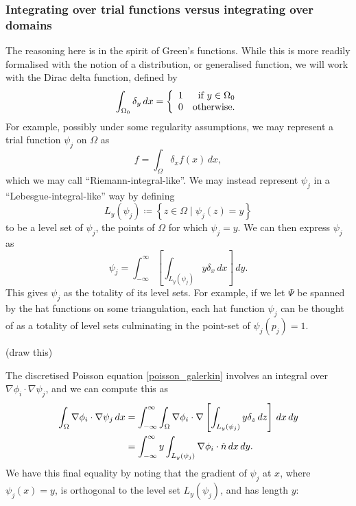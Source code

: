 \subsubsection{Integrating over trial functions versus integrating over domains}
The reasoning here is in the spirit of Green's functions.
While this is more readily formalised with the notion of a distribution, or generalised function, we will work with the Dirac delta function,
defined by
\begin{align*}
    \int_{{\Omega_0}} \delta_y\,dx = 
    \left\{\begin{array}{lr}
        1 &\text{if $y \in {\Omega_0}$}\\
        0 &\text{otherwise}.\\
        \end{array}\right.
\end{align*}
For example, possibly under some regularity assumptions, we may represent a trial function $\psi_j$ on $\Omega$ as
    $$f = \int_\Omega \delta_x f(x)\,dx,$$
which we may call ``Riemann-integral-like''.
We may instead represent $\psi_j$ in a ``Lebesgue-integral-like'' way by defining
    $$L_y(\psi_j) \coloneqq \left\{z \in \Omega \mid \psi_j(z) = y\right\}$$
to be a level set of $\psi_j$, the points of $\Omega$ for which $\psi_j = y$. We can then express $\psi_j$ as
    $$\psi_j = \int_{-\infty}^\infty \left[\int_{L_y(\psi_j)} y\delta_x \,dx\right]\,dy.$$
This gives $\psi_j$ as the totality of its level sets.
For example, if we let $\Psi$ be spanned by the hat functions on some triangulation, each hat function $\psi_j$
can be thought of as a totality of level sets culminating in the point-set of $\psi_j(p_j) = 1$.

\vskip 0.2in
(draw this)
\vskip 0.2in

The discretised Poisson equation \eqref{poisson_galerkin} involves an integral over $\nabla \phi_i \cdot \nabla \psi_j$,
and we can compute this as
\begin{equation}\label{flux_convolution}
\begin{split}
    \int_{{\Omega}} \nabla \phi_i \cdot \nabla \psi_j\,dx
        &= \int_{-\infty}^\infty \int_{{\Omega}} \nabla\phi_i \cdot \nabla\left[\int_{L_y(\psi_j)} y\delta_z \,dz\right]\,dx\,dy\\
        &= \int_{-\infty}^\infty y \int_{L_y(\psi_j)} \nabla\phi_i \cdot \hat{n}\,dx\,dy.
\end{split}
\end{equation}
We have this final equality by noting that the gradient of $\psi_j$ at $x$, where $\psi_j(x) = y$, is orthogonal to the level set $L_y{(\psi_j)}$,
and has length $y$:

